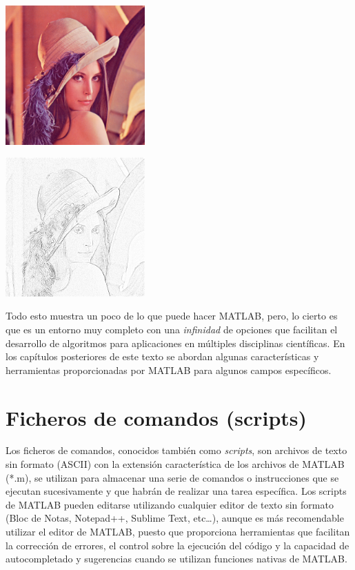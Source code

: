 \begin{center}
\includegraphics[width=0.4\textwidth]{src/img/ch1/lena.png}
\label{fig:lena}
\end{center}

\begin{center}
\includegraphics[width=0.4\textwidth]{src/img/ch1/lena_mod.png}
\label{fig:lena_mod}
\end{center}

Todo esto muestra un poco de lo que puede hacer MATLAB, pero, lo cierto
es que es un entorno muy completo con una \emph{infinidad} de opciones
que facilitan el desarrollo de algoritmos para aplicaciones en múltiples
disciplinas científicas. En los capítulos posteriores de este texto se
abordan algunas características y herramientas proporcionadas por MATLAB
para algunos campos específicos.

\section{Ficheros de comandos (scripts)}

Los ficheros de comandos, conocidos también como \emph{scripts}, son
archivos de texto sin formato (ASCII) con la extensión característica de
los archivos de MATLAB (*.m), se utilizan para almacenar una serie de
comandos o instrucciones que se ejecutan sucesivamente y que habrán de
realizar una tarea específica. Los scripts de MATLAB pueden editarse
utilizando cualquier editor de texto sin formato (Bloc de Notas,
Notepad++, Sublime Text, etc\ldots{}), aunque es más recomendable
utilizar el editor de MATLAB, puesto que proporciona herramientas que
facilitan la corrección de errores, el control sobre la ejecución del
código y la capacidad de autocompletado y sugerencias cuando se utilizan
funciones nativas de MATLAB.\\

